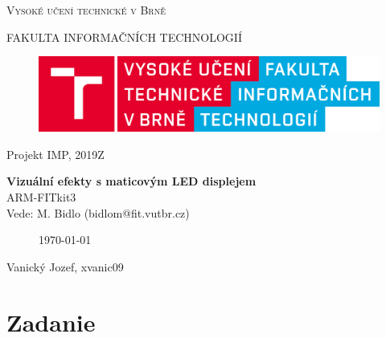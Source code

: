 \documentclass[a4paper,11pt]{article}
\begin{document}

\begin{titlepage}
\begin{center}
    {\Huge \textsc{Vysoké učení technické v Brně}}
    
    {\LARGE \uppercase{FAKULTA INFORMAČNÍCH TECHNOLOGIÍ}}
    
\begin{figure}[h]
\vspace{5.0cm}
\centering
\includegraphics[scale=0.15]{logo.png}
\vspace{-10.0cm}
\end{figure}
    
	{\LARGE Projekt IMP, 2019Z}

	{\Huge \textbf{Vizuální efekty s maticovým LED displejem}}
\\

{\LARGE {ARM-FITkit3}}\\
{\LARGE {Vede: M. Bidlo (bidlom@fit.vutbr.cz)}}\\

\begin{figure}[h]
\centering
{\Large {\mydate\today}}
\vspace{6cm}
\end{figure}

\end{center}
\begin{compactitem}
\item[] Vanický Jozef, xvanic09
\end{compactitem}

\end{titlepage}

\tableofcontents
\newpage

\section{Zadanie}
\end{document}
